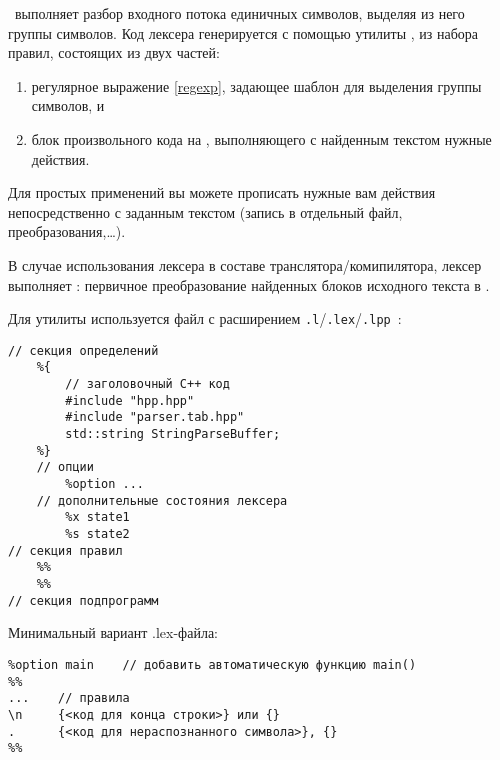\label{lexer}\secdown

\ выполняет разбор входного потока единичных символов,
выделяя из него группы символов. Код лексера генерируется с помощью утилиты
, из набора правил, состоящих из двух частей:

\begin{enumerate}
\item регулярное выражение \ref{regexp}, задающее шаблон для выделения группы 
символов, и
\item блок произвольного кода на \cpp, выполняющего с найденным текстом нужные
действия.
\end{enumerate}

Для простых применений вы можете прописать нужные вам действия непосредственно
с заданным текстом (запись в отдельный файл, преобразования,\ldots).

\begin{framed}
В случае использования лексера в составе транслятора/комипилятора, лексер
выполняет : первичное преобразование 
найденных блоков исходного текста в .
\end{framed} 


Для утилиты  используется
файл с расширением \verb|.l|/\verb|.lex|/\verb|.lpp|\ \cite{openlex}:

\begin{verbatim}
// секция определений
    %{
        // заголовочный C++ код
        #include "hpp.hpp"
        #include "parser.tab.hpp"
        std::string StringParseBuffer;
    %}
    // опции
        %option ...
    // дополнительные состояния лексера
        %x state1
        %s state2
// секция правил
    %%
    %%
// секция подпрограмм
\end{verbatim}

Минимальный вариант .lex-файла:

\begin{verbatim}
%option main    // добавить автоматическую функцию main() 
%%
...    // правила
\n     {<код для конца строки>} или {}
.      {<код для нераспознанного символа>}, {}
%%
\end{verbatim}

\secdown


